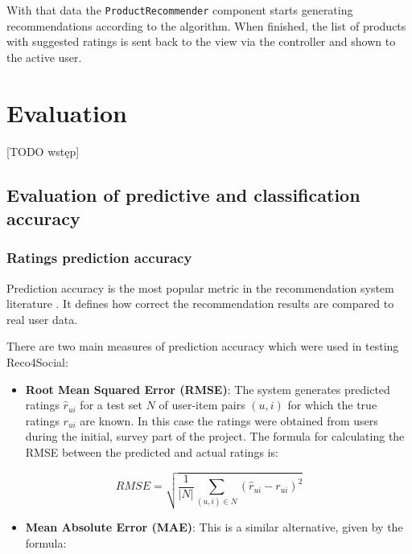 \documentclass[12pt]{report}
\begin{document}
With that data the \texttt{ProductRecommender} component starts generating recommendations according to the algorithm. When finished, the list of products with suggested ratings is sent back to the view via the controller and shown to the active user.

%


\chapter{Evaluation}\label{ch.evaluation} 

[TODO wstęp]



\section{Evaluation of predictive and classification accuracy}

\subsection{Ratings prediction accuracy}

Prediction accuracy is the most popular metric in the recommendation system literature \cite{eval_microsoft}. It defines how correct the recommendation results are compared to real user data. 

There are two main measures of prediction accuracy which were used in testing Reco4Social:
\begin{itemize}
\item {\bf Root Mean Squared Error (RMSE)}: The system generates predicted ratings $\hat{r}_{ui}$ for a test set $N$ of user-item pairs $(u,i)$ for which the true ratings $r_{ui}$ are known. In this case the ratings were obtained from users during the initial, survey part of the project. The formula for calculating the RMSE between the predicted and actual ratings is:
\end{itemize}

\begin{equation}
RMSE = \sqrt{\frac{1}{|N|} \displaystyle\sum_{(u,i) \in N} (\hat{r}_{ui} - r_{ui})^2 }
\label{eq.rmse}
\end{equation}
\hbox{}

\begin{itemize}
\item {\bf Mean Absolute Error (MAE)}: This is a similar alternative, given by the formula:
\end{itemize}
\end{document}
